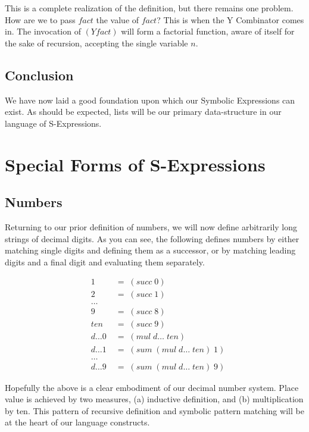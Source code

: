 This is a complete realization of the definition, but there remains one problem. 
How are we to pass $fact$ the value of $fact$? This is when the Y Combinator comes 
in. The invocation of $(Y fact)$ will form a factorial function, aware of itself 
for the sake of recursion, accepting the single variable $n$.

\subsection{Conclusion}
We have now laid a good foundation upon which our Symbolic Expressions can exist. 
As should be expected, lists will be our primary data-structure in our language of 
S-Expressions.

\section{Special Forms of S-Expressions}
\subsection{Numbers}
Returning to our prior definition of numbers, we will now define arbitrarily long 
strings of decimal digits. As you can see, the following defines numbers by either 
matching single digits and defining them as a successor, or by matching leading 
digits and a final digit and evaluating them separately.

\begin{figure}[ht]
\caption{}\label{scheme}
\begin{align*}
& 1 \; &= \; (succ \; 0)
\\& 2 \; &= \; (succ \; 1)
\\& \dots
\\& 9 \; &= \; (succ \; 8)
\\& ten \; &= \; (succ \; 9)
\\& d\dots0 \; &= \; (mul \; d\dots \; ten)
\\& d\dots1 \; &= \; (sum \; (mul \; d\dots \; ten) \; 1)
\\& \dots
\\& d\dots9 \; &= \; (sum \; (mul \; d\dots \; ten) \; 9)
\end{align*}
\end{figure}

Hopefully the above is a clear embodiment of our decimal number system. Place 
value is achieved by two measures, (a) inductive definition, and (b) 
multiplication by ten. This pattern of recursive definition and symbolic pattern 
matching will be at the heart of our language constructs.

